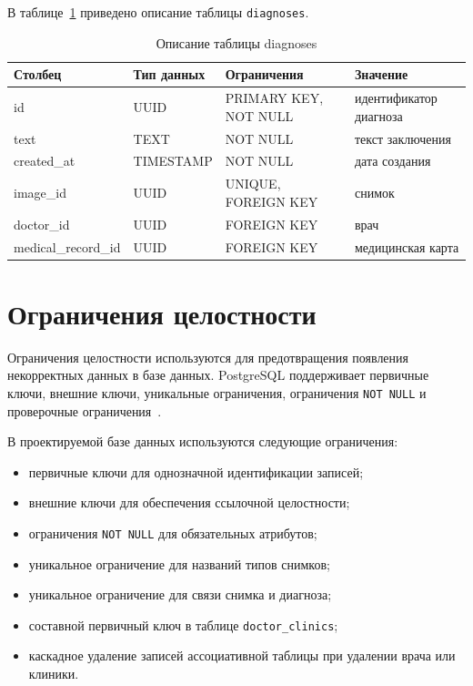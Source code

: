 В таблице~\ref{tab:diagnoses-design} приведено описание таблицы \texttt{diagnoses}.

\begin{table}[H]
	\caption{Описание таблицы diagnoses}
	\label{tab:diagnoses-design}
	\centering
	\small
	\begin{tabular}{|p{}|p{}|p{}|p{}|}
		\hline
		Столбец & Тип данных & Ограничения & Значение \\
		\hline
		id & UUID & PRIMARY KEY, NOT NULL & идентификатор диагноза \\
		\hline
		text & TEXT & NOT NULL & текст заключения \\
		\hline
		created\_at & TIMESTAMP & NOT NULL & дата создания \\
		\hline
		image\_id & UUID & UNIQUE, FOREIGN KEY & снимок \\
		\hline
		doctor\_id & UUID & FOREIGN KEY & врач \\
		\hline
		medical\_record\_id & UUID & FOREIGN KEY & медицинская карта \\
		\hline
	\end{tabular}
\end{table}

\section{Ограничения целостности}

Ограничения целостности используются для предотвращения появления некорректных данных в базе данных. PostgreSQL поддерживает первичные ключи, внешние ключи, уникальные ограничения, ограничения \texttt{NOT NULL} и проверочные ограничения~\cite{postgresql-constraints}.

В проектируемой базе данных используются следующие ограничения:
\begin{itemize}
	\item первичные ключи для однозначной идентификации записей;
	\item внешние ключи для обеспечения ссылочной целостности;
	\item ограничения \texttt{NOT NULL} для обязательных атрибутов;
	\item уникальное ограничение для названий типов снимков;
	\item уникальное ограничение для связи снимка и диагноза;
	\item составной первичный ключ в таблице \texttt{doctor\_clinics};
	\item каскадное удаление записей ассоциативной таблицы при удалении врача или клиники.
\end{itemize}

